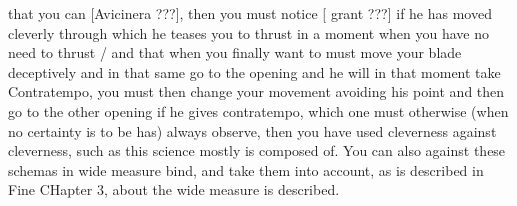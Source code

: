 \newpage


\newpage


that you can [Avicinera ???], then you must notice [ grant ???] if he
has moved cleverly through which he teases you to thrust in a moment
when you have no need to thrust / and that when you finally want to
must move your blade deceptively and in that same go to the opening
and he will in that moment take Contratempo, you must then change your
movement avoiding his point and then go to the other opening if he
gives contratempo, which one must otherwise (when no certainty is to be
has) always observe, then you have used cleverness against cleverness,
such as this science mostly is composed of. You can also against these
schemas in wide measure bind, and take them into account, as is
described in Fine CHapter 3, about the wide measure is described.


